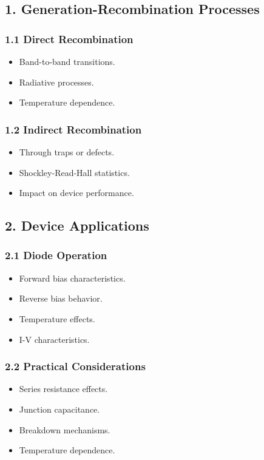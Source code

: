 \documentclass[12pt]{article}
\begin{document}
\subsection{1. Generation-Recombination Processes}

\subsubsection{1.1 Direct Recombination}
\begin{itemize}
    \item Band-to-band transitions.
    \item Radiative processes.
    \item Temperature dependence.
\end{itemize}

\subsubsection{1.2 Indirect Recombination}
\begin{itemize}
    \item Through traps or defects.
    \item Shockley-Read-Hall statistics.
    \item Impact on device performance.
\end{itemize}

\subsection{2. Device Applications}

\subsubsection{2.1 Diode Operation}
\begin{itemize}
    \item Forward bias characteristics.
    \item Reverse bias behavior.
    \item Temperature effects.
    \item I-V characteristics.
\end{itemize}

\subsubsection{2.2 Practical Considerations}
\begin{itemize}
    \item Series resistance effects.
    \item Junction capacitance.
    \item Breakdown mechanisms.
    \item Temperature dependence.
\end{itemize}
\end{document}

